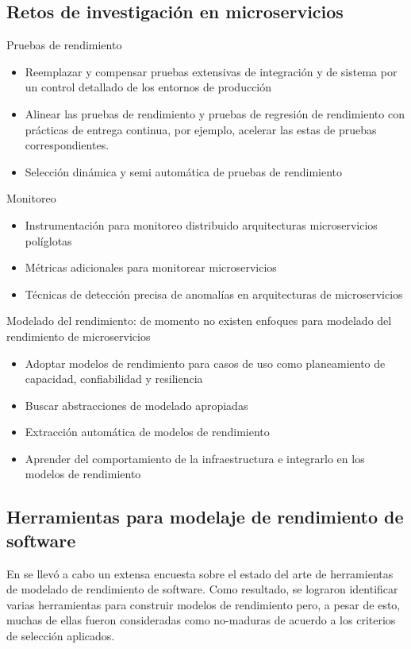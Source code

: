 \documentclass[11pt, twoside]{report}
\begin{document}
\subsection{Retos de investigación en microservicios}

Pruebas de rendimiento
\begin{itemize}
    \item Reemplazar y compensar pruebas extensivas de integración y de sistema por un control detallado de los entornos de producción
    \item Alinear las pruebas de rendimiento y pruebas de regresión de rendimiento con prácticas de entrega continua, por ejemplo, acelerar las estas de pruebas correspondientes.
    \item Selección dinámica y semi automática de pruebas de rendimiento
\end{itemize}

Monitoreo
\begin{itemize}
    \item Instrumentación para monitoreo distribuido arquitecturas microservicios políglotas 
    \item Métricas adicionales para monitorear microservicios
    \item Técnicas de detección precisa de anomalías en arquitecturas de microservicios
\end{itemize}


Modelado del rendimiento: de momento no existen enfoques para modelado del rendimiento de microservicios 
\begin{itemize}
    \item Adoptar modelos de rendimiento para casos de uso como planeamiento de capacidad, confiabilidad y resiliencia
    \item Buscar abstracciones de modelado apropiadas 
    \item Extracción automática de modelos de rendimiento
    \item Aprender del comportamiento de la infraestructura e integrarlo en los modelos de rendimiento
\end{itemize}




\subsection{Herramientas para modelaje de rendimiento de software}
En \cite{thijmen-thesis} se llevó a cabo un extensa encuesta sobre el estado del arte de herramientas de modelado de rendimiento de software. Como resultado, se lograron identificar varias herramientas para construir modelos de rendimiento pero, a pesar de esto, muchas de ellas fueron consideradas como no-maduras de acuerdo a los criterios de selección aplicados.
\end{document}
